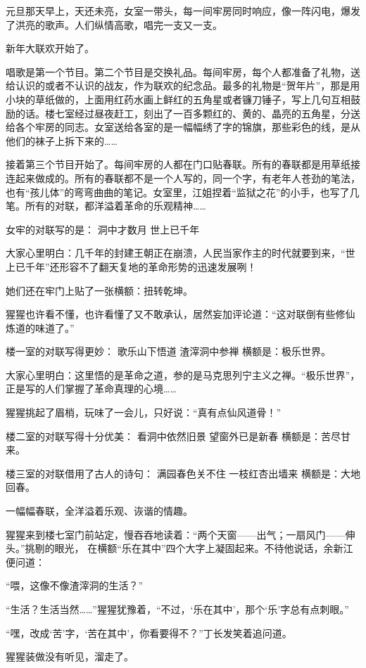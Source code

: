 \documentclass[12pt,UTF8]{ctexbook}
\begin{document}
元旦那天早上，天还未亮，女室一带头，每一间牢房同时响应，像一阵闪电，爆发了洪亮的歌声。人们纵情高歌，唱完一支又一支。

新年大联欢开始了。

唱歌是第一个节目。第二个节目是交换礼品。每间牢房，每个人都准备了礼物，送给认识的或者不认识的战友，作为联欢的纪念品。最多的礼物是“贺年片”，那是用小块的草纸做的，上面用红药水画上鲜红的五角星或者镰刀锤子，写上几句互相鼓励的话。楼七室经过昼夜赶工，刻出了一百多颗红的、黄的、晶亮的五角星，分送给各个牢房的同志。女室送给各室的是一幅幅绣了字的锦旗，那些彩色的线，是从他们的袜子上拆下来的……

接着第三个节目开始了。每间牢房的人都在门口贴春联。所有的春联都是用草纸接连起来做成的。所有的春联都不是一个人写的，同一个字，有老年人苍劲的笔法，也有“孩儿体”的弯弯曲曲的笔记。女室里，江姐捏着“监狱之花”的小手，也写了几笔。所有的对联，都洋溢着革命的乐观精神……

女牢的对联写的是：
洞中才数月
世上已千年

大家心里明白：几千年的封建王朝正在崩溃，人民当家作主的时代就要到来，“世上已千年”还形容不了翻天复地的革命形势的迅速发展咧！

她们还在牢门上贴了一张横额：扭转乾坤。

猩猩也许看不懂，也许看懂了又不敢承认，居然妄加评论道：“这对联倒有些修仙炼道的味道了。”

楼一室的对联写得更妙：
歌乐山下悟道
渣滓洞中参禅
横额是：极乐世界。

大家心里明白：这里悟的是革命之道，参的是马克思列宁主义之禅。“极乐世界”，正是写的人们掌握了革命真理的心境……

猩猩挑起了眉梢，玩味了一会儿，只好说：“真有点仙风道骨！”

楼二室的对联写得十分优美：
看洞中依然旧景
望窗外已是新春
横额是：苦尽甘来。

楼三室的对联借用了古人的诗句：
满园春色关不住
一枝红杏出墙来
横额是：大地回春。

一幅幅春联，全洋溢着乐观、诙谐的情趣。

猩猩来到楼七室门前站定，慢吞吞地读着：“两个天窗——出气；一扇风门——伸头。”挑剔的眼光，
在横额“乐在其中”四个大字上凝固起来。不待他说话，余新江便问道：

“喂，这像不像渣滓洞的生活？”

“生活？生活当然……”猩猩犹豫着，“不过，‘乐在其中’，那个‘乐’字总有点刺眼。”

“嘿，改成‘苦’字，‘苦在其中’，你看要得不？”丁长发笑着追问道。

猩猩装做没有听见，溜走了。
\end{document}
